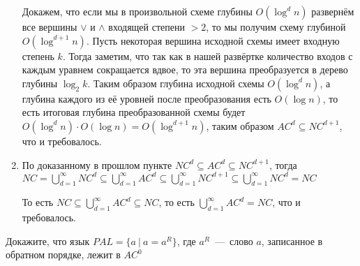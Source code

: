 \documentclass[a4paper,12pt]{article}
\begin{document}
\begin{solution}
\begin{enumerate}
\begin{center}
		\end{center}
		
		Докажем, что если мы в произвольной схеме глубины $O(\log^d n)$ развернём все вершины $\vee$ и $\wedge$ входящей степени $> 2$, то мы получим схему глубиной $O(\log^{d+1} n)$. Пусть некоторая вершина исходной схемы имеет входную степень $k$. Тогда заметим, что так как в нашей развёртке количество входов с каждым уравнем сокращается вдвое, то эта вершина преобразуется в дерево глубины $\log_2 k$. Таким образом глубина исходной схемы $O(\log^d n)$, а глубина каждого из её уровней после преобразования есть $O(\log n)$, то есть итоговая глубина преобразованной схемы будет $O(\log^d n) \cdot O(\log n) = O(\log^{d+1} n)$, таким образом $AC^d \subseteq NC^{d+1}$, что и требовалось.
		
		\item По доказанному в прошлом пункте $NC^d \subseteq AC^d \subseteq NC^{d+1}$, тогда $NC = \bigcup\limits_{d=1}^{\infty} NC^d \subseteq \bigcup\limits_{d=1}^{\infty} AC^d \subseteq \bigcup\limits_{d=1}^{\infty} NC^{d+1} \subseteq \bigcup\limits_{d=1}^{\infty} NC^d = NC$
		
		То есть $NC \subseteq \bigcup\limits_{d=1}^{\infty} AC^d \subseteq NC$, то есть  $\bigcup\limits_{d=1}^{\infty} AC^d = NC$, что и требовалось.
	\end{enumerate}
\end{solution}

\begin{tasknum}{2}
	Докажите, что язык $PAL = \{a \ | \ a = a^R\}$, где $a^R$~---~слово $a$, записанное в обратном порядке, лежит в $AC^0$
\end{tasknum}
\end{document}
